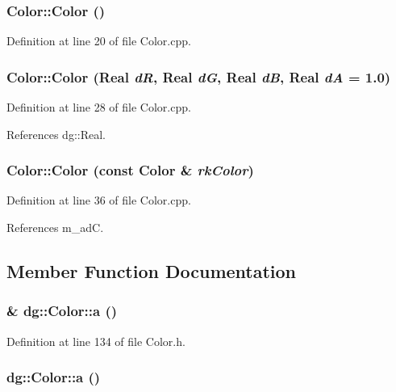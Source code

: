 \subsubsection{\setlength{\rightskip}{0pt plus 5cm}Color::Color ()}\label{classdg_1_1Color_a0}




Definition at line 20 of file Color.cpp.
\subsubsection{\setlength{\rightskip}{0pt plus 5cm}Color::Color ({\bf Real} {\em d\-R}, {\bf Real} {\em d\-G}, {\bf Real} {\em d\-B}, {\bf Real} {\em d\-A} = 1.0)}\label{classdg_1_1Color_a1}




Definition at line 28 of file Color.cpp.

References dg::Real.
\subsubsection{\setlength{\rightskip}{0pt plus 5cm}Color::Color (const Color \& {\em rk\-Color})}\label{classdg_1_1Color_a2}




Definition at line 36 of file Color.cpp.

References m\_\-ad\-C.

\subsection{Member Function Documentation}
\subsubsection{ \& dg::Color::a ()\hspace{0.3cm}{\tt  [inline]}}\label{classdg_1_1Color_a10}




Definition at line 134 of file Color.h.
\subsubsection{ dg::Color::a ()\hspace{0.3cm}{\tt  [inline]}}\label{classdg_1_1Color_a6}




